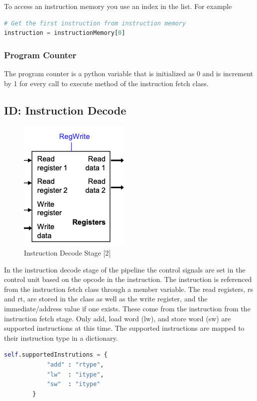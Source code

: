 \documentclass[conference]{IEEEtran}
\begin{document}
To access an instruction memory you use an index in the list.  For example
\begin{lstlisting}[language=Python]
# Get the first instruction from instruction memory
instruction = instructionMemory[0]
\end{lstlisting}

\subsubsection{Program Counter}

The program counter is a python variable that is initialized as 0 and is increment by 1 for every call to execute method of the instruction fetch class.

\subsection{ID: Instruction Decode}

\begin{figure}
    \centering
    \includegraphics[scale=.4]{instructiondecode.png}
    \caption{Instruction Decode Stage [2]}
    \label{fig:instructiondecode}
\end{figure}

In the instruction decode stage of the pipeline the control signals are set in the control unit based on the opcode in the instruction.  The instruction is referenced from the instruction fetch class through a member variable.  The read registers, rs and rt, are stored in the class as well as the write register, and the immediate/address value if one exists.  These come from the instruction from the instruction fetch stage.  Only add, load word (lw), and store word (sw) are supported instructions at this time.  The supported instructions are mapped to their instruction type in a dictionary.

\begin{lstlisting}[language=Python]
self.supportedInstrutions = {
            "add" : "rtype",
            "lw"  : "itype",
            "sw"  : "itype"
        }
\end{lstlisting}
\end{document}
